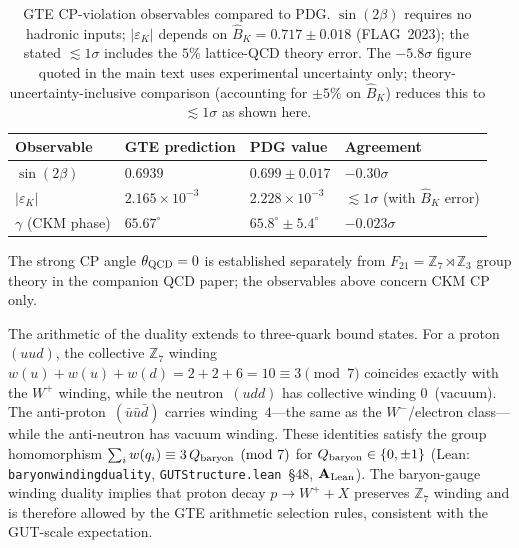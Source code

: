 \documentclass[11pt]{article}
\theoremstyle{remark}
\newcommand{\ZS}{\mathbb{Z}_7}
\newcommand{\lean}[1]{%
  \penalty-100
  \begingroup\def\_{\textunderscore\allowbreak}\texttt{#1}\endgroup}
\newcommand{\CatAL}{\ensuremath{\textbf{A}_{\rm Lean}}}
\begin{document}
\begin{table}[h!]
\centering
\small
\begin{tabular}{llll}
\toprule
Observable & GTE prediction & PDG value & Agreement \\
\midrule
$\sin(2\beta)$ & $0.6939$ & $0.699 \pm 0.017$ & $-0.30\sigma$ \\
$|\varepsilon_K|$ & $2.165 \times 10^{-3}$ & $2.228 \times 10^{-3}$ & ${\lesssim}1\sigma$ (with $\hat{B}_K$ error) \\
$\gamma$ (CKM phase) & $65.67^\circ$ & $65.8^\circ \pm 5.4^\circ$ & $-0.023\sigma$ \\
\bottomrule
\end{tabular}
\caption{GTE CP-violation observables compared to PDG.
$\sin(2\beta)$ requires no hadronic inputs; $|\varepsilon_K|$
depends on $\hat{B}_K = 0.717 \pm 0.018$ (FLAG~2023); the stated ${\lesssim}1\sigma$
includes the $5\%$ lattice-QCD theory error.
The $-5.8\sigma$ figure quoted in the main text uses experimental uncertainty only;
theory-uncertainty-inclusive comparison (accounting for $\pm5\%$ on $\hat{B}_K$)
reduces this to ${\lesssim}1\sigma$ as shown here.}
\label{tab:cp_observables}
\end{table}
The strong CP angle $\theta_{\rm QCD}=0$ is established separately from
$F_{21}=\mathbb{Z}_7\rtimes\mathbb{Z}_3$ group theory in the companion
QCD paper; the observables above concern CKM CP only.

\smallskip
The arithmetic of the duality extends to three-quark bound states.
For a proton~$(uud)$, the collective $\ZS$ winding
$w(u)+w(u)+w(d) = 2+2+6 = 10 \equiv 3 \pmod{7}$
coincides exactly with the $W^+$ winding, while the neutron~$(udd)$
has collective winding $0$~(vacuum).
The anti-proton~$(\bar{u}\bar{u}\bar{d})$ carries winding~$4$---the same
as the $W^-$/electron class---while the anti-neutron has vacuum winding.
These identities satisfy the group homomorphism
$\sum_i w(q_i) \equiv 3\,Q_{\rm baryon} \pmod{7}$ for
$Q_{\rm baryon} \in \{0,\pm 1\}$
(Lean: \lean{baryon\_winding\_duality},
\texttt{GUTStructure.lean}~\S48, $\CatAL$).
The baryon-gauge winding duality implies that proton decay
$p \to W^+ + X$ preserves $\ZS$ winding and is therefore allowed by
the GTE arithmetic selection rules, consistent with the GUT-scale
expectation.
\end{document}
